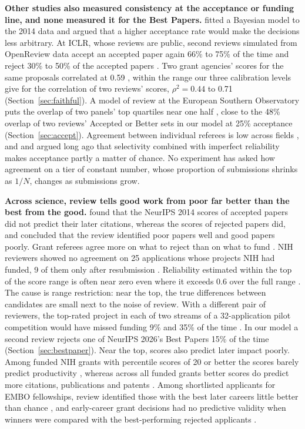\documentclass{article}
\begin{document}
\textbf{Other studies also measured consistency at the acceptance or funding line, and none measured it for the Best Papers.} \citet{francois2015arbitrariness} fitted a Bayesian model to the 2014 data and argued that a higher acceptance rate would make the decisions less arbitrary. At ICLR, whose reviews are public, second reviews simulated from OpenReview data accept an accepted paper again 66\% to 75\% of the time \citep{tran2020open} and reject 30\% to 50\% of the accepted papers \citep{huang2026review}. Two grant agencies' scores for the same proposals correlated at 0.59 \citep{hodgson1997reliable}, within the range our three calibration levels give for the correlation of two reviews' scores, $\rho^2=0.44$ to 0.71 (Section~\ref{sec:faithful}). A model of review at the European Southern Observatory puts the overlap of two panels' top quartiles near one half \citep{patat2018peer}, close to the 48\% overlap of two reviews' Accepted or Better sets in our model at 25\% acceptance (Section~\ref{sec:accept}). Agreement between individual referees is low across fields \citep{cole1981chance,cicchetti1991reliability,bornmann2010reliability}, and \citet{stinchcombe1986journal} and \citet{lindsey1988assessing} argued long ago that selectivity combined with imperfect reliability makes acceptance partly a matter of chance. No experiment has asked how agreement on a tier of constant number, whose proportion of submissions shrinks as $1/N$, changes as submissions grow.

\textbf{Across science, review tells good work from poor far better than the best from the good.} \citet{cortes2021inconsistency} found that the NeurIPS 2014 scores of accepted papers did not predict their later citations, whereas the scores of rejected papers did, and concluded that the review identified poor papers well and good papers poorly. Grant referees agree more on what to reject than on what to fund \citep{cicchetti1991reliability}. NIH reviewers showed no agreement on 25 applications whose projects NIH had funded, 9 of them only after resubmission \citep{pier2018low}. Reliability estimated within the top of the score range is often near zero even where it exceeds 0.6 over the full range \citep{erosheva2021zero}. The cause is range restriction: near the top, the true differences between candidates are small next to the noise of review. With a different pair of reviewers, the top-rated project in each of two streams of a 32-application pilot competition would have missed funding 9\% and 35\% of the time \citep{mayo2006peering}. In our model a second review rejects one of NeurIPS 2026's Best Papers 15\% of the time (Section~\ref{sec:bestpaper}). Near the top, scores also predict later impact poorly. Among funded NIH grants with percentile scores of 20 or better the scores barely predict productivity \citep{fang2016percentile}, whereas across all funded grants better scores do predict more citations, publications and patents \citep{li2015big}. Among shortlisted applicants for EMBO fellowships, review identified those with the best later careers little better than chance \citep{klaus2018talent}, and early-career grant decisions had no predictive validity when winners were compared with the best-performing rejected applicants \citep{vandenbesselaar2015early}.
\end{document}
